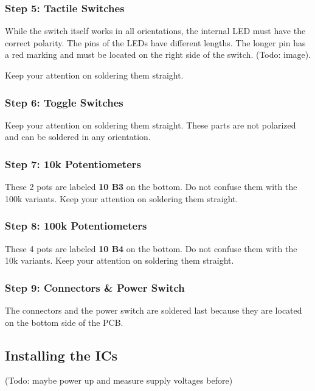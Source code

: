 \documentclass{scrartcl}
\begin{document}
\subsubsection{Step 5: Tactile Switches}

While the switch itself works in all orientations, the internal LED must have the correct polarity. The pins of the LEDs have different lengths. The longer pin has a red marking and must be located on the right side of the switch. (Todo: image).

Keep your attention on soldering them straight.

\subsubsection{Step 6: Toggle Switches}

Keep your attention on soldering them straight. These parts are not polarized and can be soldered in any orientation.

\subsubsection{Step 7: 10k Potentiometers}

These 2 pots are labeled \textbf{10 B3} on the bottom. Do not confuse them with the 100k variants. Keep your attention on soldering them straight.

\subsubsection{Step 8: 100k Potentiometers}

These 4 pots are labeled \textbf{10 B4} on the bottom. Do not confuse them with the 10k variants. Keep your attention on soldering them straight.

\subsubsection{Step 9: Connectors \& Power Switch}

The connectors and the power switch are soldered last because they are located on the bottom side of the PCB.

\subsection{Installing the ICs}

(Todo: maybe power up and measure supply voltages before)
\end{document}
